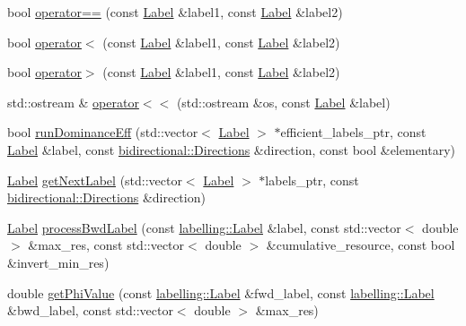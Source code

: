 \begin{DoxyCompactItemize}
\item 
bool \hyperlink{namespacelabelling_a96ce48b2672548c132a1032820202375}{operator==} (const \hyperlink{classlabelling_1_1Label}{Label} \&label1, const \hyperlink{classlabelling_1_1Label}{Label} \&label2)
\item 
bool \hyperlink{namespacelabelling_a71cfecc2e31a39a8743e584c12b3fd32}{operator$<$} (const \hyperlink{classlabelling_1_1Label}{Label} \&label1, const \hyperlink{classlabelling_1_1Label}{Label} \&label2)
\item 
bool \hyperlink{namespacelabelling_a079cd7339d7a3797d35ebbd5b4e930f6}{operator$>$} (const \hyperlink{classlabelling_1_1Label}{Label} \&label1, const \hyperlink{classlabelling_1_1Label}{Label} \&label2)
\item 
std\+::ostream \& \hyperlink{namespacelabelling_ac988eedb6084b429a46b070f3ff6d544}{operator$<$$<$} (std\+::ostream \&os, const \hyperlink{classlabelling_1_1Label}{Label} \&label)
\item 
bool \hyperlink{namespacelabelling_ac6d6bb89c176d0f2db264457d60c5bd8}{run\+Dominance\+Eff} (std\+::vector$<$ \hyperlink{classlabelling_1_1Label}{Label} $>$ $\ast$efficient\+\_\+labels\+\_\+ptr, const \hyperlink{classlabelling_1_1Label}{Label} \&label, const \hyperlink{namespacebidirectional_a4cbe6f0bfbd3629c2cd44c98014aed70}{bidirectional\+::\+Directions} \&direction, const bool \&elementary)
\item 
\hyperlink{classlabelling_1_1Label}{Label} \hyperlink{namespacelabelling_a7d32365acb745f452e0b81beed2ce2be}{get\+Next\+Label} (std\+::vector$<$ \hyperlink{classlabelling_1_1Label}{Label} $>$ $\ast$labels\+\_\+ptr, const \hyperlink{namespacebidirectional_a4cbe6f0bfbd3629c2cd44c98014aed70}{bidirectional\+::\+Directions} \&direction)
\item 
\hyperlink{classlabelling_1_1Label}{Label} \hyperlink{namespacelabelling_ae172758fb8d07cc0a490d8715966e1b7}{process\+Bwd\+Label} (const \hyperlink{classlabelling_1_1Label}{labelling\+::\+Label} \&label, const std\+::vector$<$ double $>$ \&max\+\_\+res, const std\+::vector$<$ double $>$ \&cumulative\+\_\+resource, const bool \&invert\+\_\+min\+\_\+res)
\item 
double \hyperlink{namespacelabelling_a5bb0d5a3d1eeb92546902c6cdc12c71d}{get\+Phi\+Value} (const \hyperlink{classlabelling_1_1Label}{labelling\+::\+Label} \&fwd\+\_\+label, const \hyperlink{classlabelling_1_1Label}{labelling\+::\+Label} \&bwd\+\_\+label, const std\+::vector$<$ double $>$ \&max\+\_\+res)

\end{DoxyCompactItemize}

